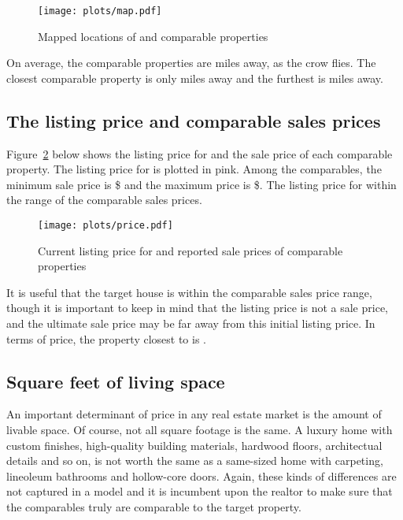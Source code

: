 \documentclass[
12pt, %
letterpaper, %
oneside, %
headinclude,footinclude, %
BCOR5mm, %
]{scrartcl}
\begin{document}
\begin{figure}[h!]
\centering
\caption{Mapped locations of \PropertyName{} and comparable properties}  \label{fig:map}  
\texttt{[image: plots/map.pdf]} 
\end{figure}

On average, the comparable properties are \AvgDistance{} miles away, as the crow flies.
The closest comparable property is only \MinDistance{} miles away and the furthest is \MaxDistance{} miles away.
\States{}
\Cities{}

\subsection{The listing price and comparable sales prices}

Figure~\ref{fig:price} below shows the listing price for \textbf{\PropertyName{}} and the sale price of each comparable property.
The listing price for \PropertyName{} is plotted in pink. 
Among the comparables, the minimum sale price is \$\MinPrice{} and the maximum price is \$\MaxPrice{}.
The listing price for \PropertyName{} \InPriceRange{} within the range of the comparable sales prices. 

\begin{figure}[htb]
\centering
\caption{Current listing price for \PropertyName{} and reported sale prices of comparable properties} 
\label{fig:price}  
\texttt{[image: plots/price.pdf]} 
\end{figure}

It is useful that the target house is within the comparable sales price range, though it is important to keep in mind that the listing price is not a sale price, and the ultimate sale price may be far away from this initial listing price.
In terms of price, the property closest to \PropertyName{} is \ClosestOnPrice{}. 

\subsection{Square feet of living space}
An important determinant of price in any real estate market is the amount of livable space.
Of course, not all square footage is the same.
A luxury home with custom finishes, high-quality building materials, hardwood floors, architectual details and so on, is not worth the same as a same-sized home with carpeting, lineoleum bathrooms and hollow-core doors.
Again, these kinds of differences are not captured in a model and it is incumbent upon the realtor to make sure that the comparables truly are comparable to the target property. 
\end{document}
